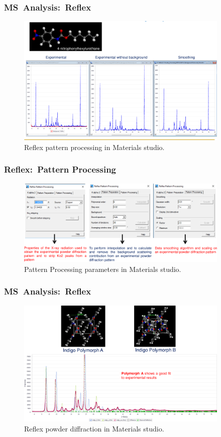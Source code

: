 \frame
{
	\frametitle{\textrm{MS~Analysis:~Reflex}}
\begin{figure}[h!]
\centering
\vspace*{-0.14in}
\includegraphics[height=2.47in,width=4.00in,viewport=0 0 1256 775,clip]{Figures/MS-Analysis_Reflex-example.png}
\caption{\tiny \textrm{Reflex pattern processing in Materials studio.}}%
\label{MS-Analysis-Reflex-example-1}
\end{figure}
}

\frame
{
	\frametitle{\textrm{Reflex:~Pattern Processing}}
\begin{figure}[h!]
\centering
\vspace*{-0.10in}
\includegraphics[height=1.63in,width=4.00in,viewport=0 0 1349 548,clip]{Figures/MS-Analysis_Reflex_Pattern-Processing.png}
\caption{\tiny \textrm{Pattern Processing parameters in Materials studio.}}%
\label{Reflex-Pattern-Processing}
\end{figure}
}

\frame
{
	\frametitle{\textrm{MS~Analysis:~Reflex}}
\begin{figure}[h!]
\centering
\vspace*{-0.14in}
\includegraphics[height=2.41in,width=4.00in,viewport=0 0 1270 764,clip]{Figures/MS-Analysis_Reflex_Powder-Diffraction-example.png}
\caption{\tiny \textrm{Reflex powder diffraction in Materials studio.}}%
\label{MS-Analysis-Reflex-example-2}
\end{figure}
}

